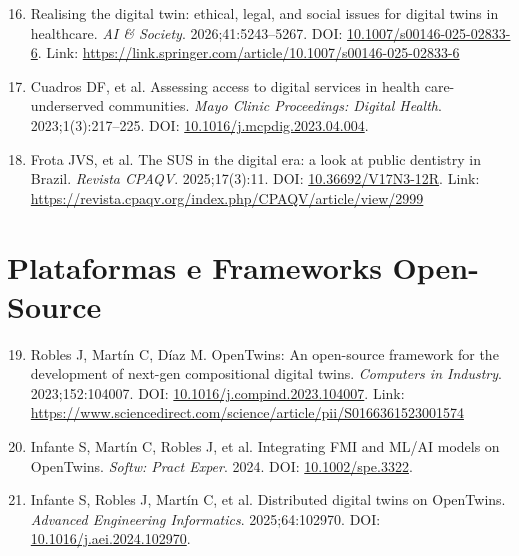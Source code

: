 \begin{enumerate}
    \setcounter{enumi}{15}
    \item \label{ref:springer2026} Realising the digital twin: ethical, legal, and social issues for digital twins in healthcare. \textit{AI \& Society}. 2026;41:5243--5267. DOI: \href{https://doi.org/10.1007/s00146-025-02833-6}{10.1007/s00146-025-02833-6}. Link: \url{https://link.springer.com/article/10.1007/s00146-025-02833-6}
    
    \item \label{ref:cuadros2023} Cuadros DF, et al. Assessing access to digital services in health care-underserved communities. \textit{Mayo Clinic Proceedings: Digital Health}. 2023;1(3):217--225. DOI: \href{https://doi.org/10.1016/j.mcpdig.2023.04.004}{10.1016/j.mcpdig.2023.04.004}.
    
    \item \label{ref:frota2025} Frota JVS, et al. The SUS in the digital era: a look at public dentistry in Brazil. \textit{Revista CPAQV}. 2025;17(3):11. DOI: \href{https://doi.org/10.36692/V17N3-12R}{10.36692/V17N3-12R}. Link: \url{https://revista.cpaqv.org/index.php/CPAQV/article/view/2999}
\end{enumerate}

\section{Plataformas e Frameworks Open-Source}

\begin{enumerate}
    \setcounter{enumi}{18}
    \item \label{ref:robles2023} Robles J, Martín C, Díaz M. OpenTwins: An open-source framework for the development of next-gen compositional digital twins. \textit{Computers in Industry}. 2023;152:104007. DOI: \href{https://doi.org/10.1016/j.compind.2023.104007}{10.1016/j.compind.2023.104007}. Link: \url{https://www.sciencedirect.com/science/article/pii/S0166361523001574}
    
    \item \label{ref:infante2024} Infante S, Martín C, Robles J, et al. Integrating FMI and ML/AI models on OpenTwins. \textit{Softw: Pract Exper}. 2024. DOI: \href{https://doi.org/10.1002/spe.3322}{10.1002/spe.3322}.
    
    \item \label{ref:infante2025} Infante S, Robles J, Martín C, et al. Distributed digital twins on OpenTwins. \textit{Advanced Engineering Informatics}. 2025;64:102970. DOI: \href{https://doi.org/10.1016/j.aei.2024.102970}{10.1016/j.aei.2024.102970}.
\end{enumerate}

